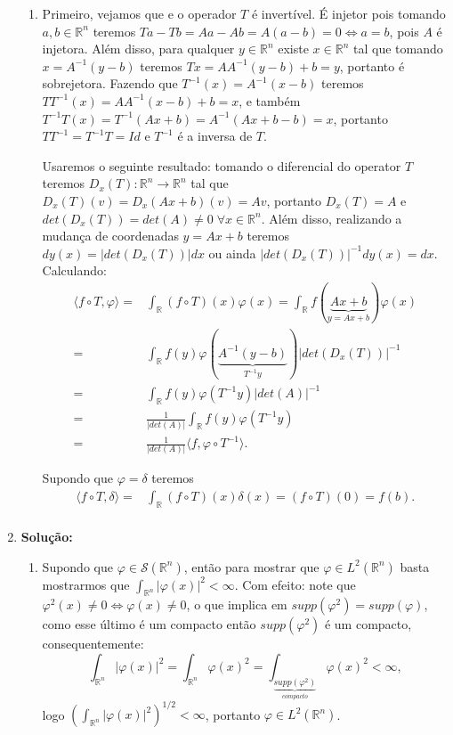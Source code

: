 \documentclass{article}
\begin{document}
\begin{enumerate}
\begin{enumerate}
				\item Primeiro, vejamos que e o operador $T$ é invertível. É injetor pois tomando $a, b \in \mathbb{R}^{n}$ teremos $Ta- Tb = Aa - Ab = A(a-b) = 0 \iff a=b$, pois $A$ é injetora. Além disso, para qualquer $y \in \mathbb{R}^{n}$ existe $x \in \mathbb{R}^{n}$ tal que tomando $x = A^{-1}(y -b)$ teremos $Tx = AA^{-1}(y -b) + b = y$, portanto é sobrejetora. Fazendo que $T^{-1}(x) = A^{-1}(x - b)$ teremos $TT^{-1}(x) = AA^{-1}(x - b) + b = x$, e também $T^{-1}T(x) = T^{-1}(Ax + b) = A^{-1}(Ax+b - b) = x$, portanto $TT^{-1} = T^{-1}T = Id$ e $T^{-1}$ é a inversa de $T$.
				
				Usaremos o seguinte resultado: tomando o diferencial do operator $T$ teremos $D_{x}(T): \mathbb{R}^{n} \to \mathbb{R}^{n}$ tal que $D_{x}(T)(v) = D_{x}(Ax+b)(v) = Av$, portanto $D_{x}(T) = A$ e $det(D_{x}(T)) = det(A) \neq 0 \; \forall x \in \mathbb{R}^{n}$. Além disso, realizando a mudança de coordenadas $y = Ax+b$ teremos $dy(x) = |det(D_{x}(T))|dx$ ou ainda $|det(D_{x}(T))|^{-1} dy(x) = dx$. Calculando:
				$$
				\begin{aligned}
				\langle f \circ T, \varphi \rangle = & \int_{\mathbb{R}} (f \circ T)(x)\varphi(x)
				= \int_{\mathbb{R}} f(\underbrace{ Ax+b }_{y = Ax+b})\varphi(x)
				\\
				= & \int_{\mathbb{R}} f(y)\varphi(\underbrace{ A^{-1}(y - b)}_{T^{-1}y} ) \Big| det(D_{x}(T)) \Big|^{-1}
				\\
				= & \int_{\mathbb{R}} f(y)\varphi(T^{-1}y)  |det(A)|^{-1}
				\\
				= & \frac{1}{|det(A)|} \int_{\mathbb{R}} f(y)\varphi(T^{-1}y)
				\\
				= & \frac{1}{|det(A)|} \langle f, \varphi \circ T^{-1}\rangle.
				\end{aligned}
				$$
				
				Supondo que $\varphi = \delta$ teremos
				$$
				\begin{aligned}
				\langle f \circ T, \delta \rangle = & \int_{\mathbb{R}} (f \circ T)(x)\delta(x)
				= (f \circ T)(0) = f(b).
				\\
				\end{aligned}
				$$
				
			\end{enumerate}
		
		\item \textbf{Solução:}
			\begin{enumerate}
				\item Supondo que $\varphi \in \mathcal{S}(\mathbb{R}^{n})$, então para mostrar que $\varphi \in L^{2}(\mathbb{R}^{n})$ basta mostrarmos que $\int_{\mathbb{R}^{n}} |\varphi(x)|^{2} < \infty$. Com efeito: note que $\varphi^{2}(x) \neq 0 \iff \varphi(x) \neq 0 $, o que implica em $supp(\varphi^{2}) = supp(\varphi)$, como esse último é um compacto então $supp(\varphi^{2})$ é um compacto, consequentemente:
				$$
				\int_{\mathbb{R}^{n}} |\varphi(x)|^{2} = \int_{\mathbb{R}^{n}} \varphi(x)^{2} = \int_{\underbrace{ supp(\varphi^{2}) }_{compacto}} \varphi(x)^{2} < \infty,
				$$
				logo $(\int_{\mathbb{R}^{n}} |\varphi(x)|^{2})^{1/2} < \infty$, portanto $\varphi \in L^{2}(\mathbb{R}^{n})$.
				

\end{enumerate}
\end{enumerate}
\end{document}
